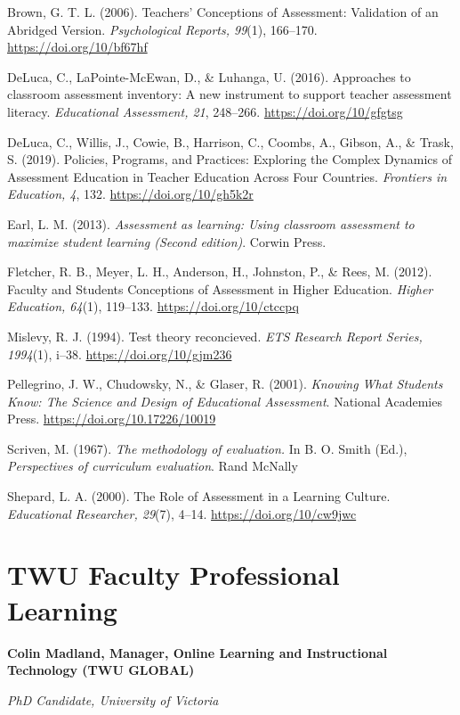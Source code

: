 \documentclass[
]{book}
\begin{document}
Brown, G. T. L. (2006). Teachers' Conceptions of Assessment: Validation of an Abridged Version. \emph{Psychological Reports, 99}(1), 166--170. \url{https://doi.org/10/bf67hf}

DeLuca, C., LaPointe-McEwan, D., \& Luhanga, U. (2016). Approaches to classroom assessment inventory: A new instrument to support teacher assessment literacy. \emph{Educational Assessment, 21}, 248--266. \url{https://doi.org/10/gfgtsg}

DeLuca, C., Willis, J., Cowie, B., Harrison, C., Coombs, A., Gibson, A., \& Trask, S. (2019). Policies, Programs, and Practices: Exploring the Complex Dynamics of Assessment Education in Teacher Education Across Four Countries. \emph{Frontiers in Education, 4}, 132. \url{https://doi.org/10/gh5k2r}

Earl, L. M. (2013). \emph{Assessment as learning: Using classroom assessment to maximize student learning (Second edition)}. Corwin Press.

Fletcher, R. B., Meyer, L. H., Anderson, H., Johnston, P., \& Rees, M. (2012). Faculty and Students Conceptions of Assessment in Higher Education. \emph{Higher Education, 64}(1), 119--133. \url{https://doi.org/10/ctccpq}

Mislevy, R. J. (1994). Test theory reconcieved. \emph{ETS Research Report Series, 1994}(1), i--38. \url{https://doi.org/10/gjm236}

Pellegrino, J. W., Chudowsky, N., \& Glaser, R. (2001). \emph{Knowing What Students Know: The Science and Design of Educational Assessment}. National Academies Press. \url{https://doi.org/10.17226/10019}

Scriven, M. (1967). \emph{The methodology of evaluation.} In B. O. Smith (Ed.), \emph{Perspectives of curriculum evaluation}. Rand McNally

Shepard, L. A. (2000). The Role of Assessment in a Learning Culture. \emph{Educational Researcher, 29}(7), 4--14. \url{https://doi.org/10/cw9jwc}

\hypertarget{twu-faculty-professional-learning}{%
\chapter{TWU Faculty Professional Learning}\label{twu-faculty-professional-learning}}

\textbf{Colin Madland, Manager, Online Learning and Instructional Technology (TWU GLOBAL) }

\emph{PhD Candidate, University of Victoria }
\end{document}
